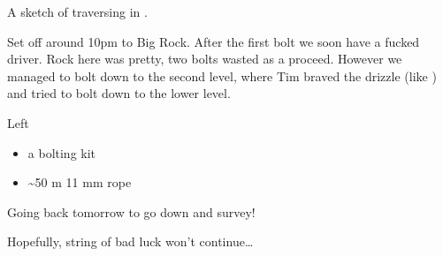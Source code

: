 \begin{marginfigure}
\checkoddpage \ifoddpage \forcerectofloat \else \forceversofloat \fi
\centering
 \caption{A sketch of traversing in . }
 \label{bcrm traverse}
\end{marginfigure}



Set off around 10pm to Big Rock. After the first bolt we soon have a fucked driver. Rock here was pretty, two bolts wasted as a proceed. However we managed to bolt down to the second level, where Tim braved the drizzle (like ) and tried to bolt down to the lower level.

Left

\begin{itemize}
\item
  a bolting kit
\item
  \textasciitilde 50 m 11 mm rope
\end{itemize}

Going back tomorrow to go down and survey!

Hopefully, string of bad luck won't continue\ldots{}




